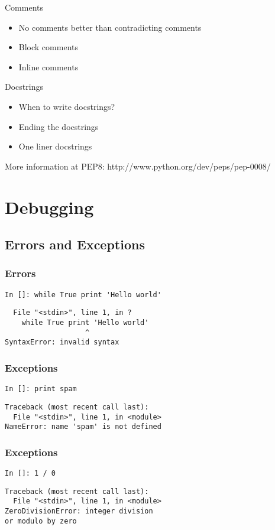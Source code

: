\documentclass[compress,14pt]{beamer}
\newcounter{time}
\newcommand{\inctime}[1]{\addtocounter{time}{#1}{\vspace*{0.1in}\tiny \thetime\ m}}
\begin{document}
\begin{frame}{Comments}
  \begin{itemize}
        \item No comments better than contradicting comments
        \item Block comments
        \item Inline comments
   \end{itemize}
\end{frame}

\begin{frame}{Docstrings}
  \begin{itemize}
        \item When to write docstrings?
        \item Ending the docstrings
        \item One liner docstrings
   \end{itemize}
More information at PEP8: http://www.python.org/dev/peps/pep-0008/
\inctime{5}
\end{frame}

\section{Debugging}
\subsection{Errors and Exceptions}
\begin{frame}[fragile]
 \frametitle{Errors}
 \begin{lstlisting}
In []: while True print 'Hello world'
 \end{lstlisting}
\pause
  \begin{lstlisting}
  File "<stdin>", line 1, in ?
    while True print 'Hello world'
                   ^
SyntaxError: invalid syntax
\end{lstlisting}
\end{frame}

\begin{frame}[fragile]
 \frametitle{Exceptions}
 \begin{lstlisting}
In []: print spam
\end{lstlisting}
\pause
\begin{lstlisting}
Traceback (most recent call last):
  File "<stdin>", line 1, in <module>
NameError: name 'spam' is not defined
\end{lstlisting}
\end{frame}

\begin{frame}[fragile]
 \frametitle{Exceptions}
 \begin{lstlisting}
In []: 1 / 0
\end{lstlisting}
\pause
\begin{lstlisting}
Traceback (most recent call last):
  File "<stdin>", line 1, in <module>
ZeroDivisionError: integer division 
or modulo by zero
\end{lstlisting}
\end{frame}
\end{document}
